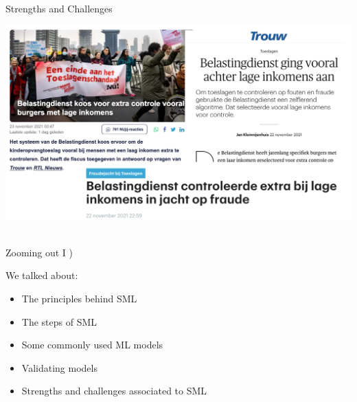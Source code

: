 \documentclass[handout]{beamer}
\begin{document}
\begin{frame}{Strengths and Challenges}
	
	\begin{center}
		\includegraphics[width=\linewidth,height=\textheight,keepaspectratio]{../pictures/toeslagenaffaire_headlines.png} \\\
	\end{center}
	
	
\end{frame}


\begin{frame}{Zooming out I )} 
	
	We talked about:
	\begin{itemize}
		\item The principles behind SML
		\item The steps of SML
		\item Some commonly used ML models
		\item Validating models
		\item Strengths and challenges associated to SML \\\
	\end{itemize}
	
	
\end{frame}
\end{document}
